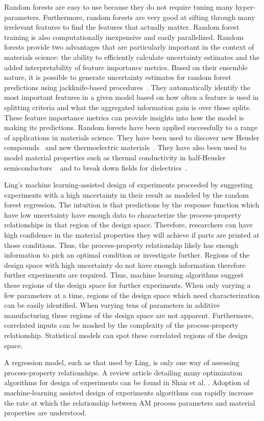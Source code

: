 Random forests are easy to use because they do not require tuning many hyper-parameters. Furthermore, random forests are very good at sifting through many irrelevant features to find the features that actually matter. Random forest training is also computationally inexpensive and easily parallelized. Random forests provide two advantages that are particularly important in the context of materials science: the ability to efficiently calculate uncertainty estimates and the added interpretability of feature importance metrics. Based on their ensemble nature, it is possible to generate uncertainty estimates for random forest predictions using jackknife-based procedures~\cite{Efron1992, Efron2014, Wager2014}. They automatically identify the most important features in a given model based on how often a feature is used in splitting criteria and what the aggregated information gain is over those splits. These feature importance metrics can provide insights into how the model is making its predictions. Random forests have been applied successfully to a range of applications in materials science. They have been used to discover new Heusler compounds~\cite{Oliynyk2016} and new thermoelectric materials~\cite{Gaultois2016}. They have also been used to model material properties such as thermal conductivity in half-Heusler semiconductors ~\cite{Carrete2014} and to break down fields for dielectrics~\cite{Kim2016}. 

Ling's machine learning-assisted design of experiments proceeded by suggesting experiments with a high uncertainty in their result as modeled by the random forest regression. The intuition is that predictions by the response function which have low uncertainty have enough data to characterize the process-property relationships in that region of the design space. Therefore, researchers can have high confidence in the material properties they will achieve if parts are printed at those conditions. Thus, the process-property relationship likely has enough information to pick an optimal condition or investigate further. Regions of the design space with high uncertainty do not have enough information therefore further experiments are required. Thus, machine learning algorithms suggest these regions of the design space for further experiments. When only varying a few parameters at a time, regions of the design space which need characterization can be easily identified. When varying tens of parameters in additive manufacturing these regions of the design space are not apparent. Furthermore, correlated inputs can be masked by the complexity of the process-property relationship. Statistical models can spot these correlated regions of the design space.

A regression model, such as that used by Ling, is only one way of assessing process-property relationships. A review article detailing many optimization algorithms for design of experiments can be found in Shan et al. \cite{Shan2010}. Adoption of machine-learning assisted design of experiments algorithms can rapidly increase the rate at which the relationship between AM process parameters and material properties are understood. 
